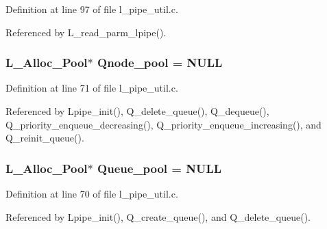 Definition at line 97 of file l\_\-pipe\_\-util.c.

Referenced by L\_\-read\_\-parm\_\-lpipe().
\subsubsection{\setlength{\rightskip}{0pt plus 5cm}L\_\-Alloc\_\-Pool$\ast$ \bf{Qnode\_\-pool} = NULL}\label{l__pipe__util_8c_b2b35dba38efd9d6e53512e38d014729}




Definition at line 71 of file l\_\-pipe\_\-util.c.

Referenced by Lpipe\_\-init(), Q\_\-delete\_\-queue(), Q\_\-dequeue(), Q\_\-priority\_\-enqueue\_\-decreasing(), Q\_\-priority\_\-enqueue\_\-increasing(), and Q\_\-reinit\_\-queue().
\subsubsection{\setlength{\rightskip}{0pt plus 5cm}L\_\-Alloc\_\-Pool$\ast$ \bf{Queue\_\-pool} = NULL}\label{l__pipe__util_8c_4a9d1f680824f7426e01b910d4cc2b03}




Definition at line 70 of file l\_\-pipe\_\-util.c.

Referenced by Lpipe\_\-init(), Q\_\-create\_\-queue(), and Q\_\-delete\_\-queue().